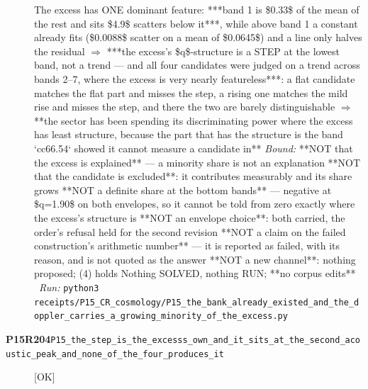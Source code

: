 \begin{description}
The excess has ONE dominant feature: ***band 1 is \$0.33\$ of the mean of the rest and sits \$4.9\$ scatters below it***, while above band 1 a constant already fits (\$0.0088\$ scatter on a mean of \$0.0645\$) and a line only halves the residual \ensuremath{\Rightarrow} ***the excess's \$q\$-structure is a STEP at the lowest band, not a trend --- and all four candidates were judged on a trend across bands 2--7, where the excess is very nearly featureless***: a flat candidate matches the flat part and misses the step, a rising one matches the mild rise and misses the step, and there the two are barely distinguishable \ensuremath{\Rightarrow} **the sector has been spending its discriminating power where the excess has least structure, because the part that has the structure is the band `cc66.54` showed it cannot measure a candidate in**
 \emph{Bound:}  **NOT that the excess is explained** --- a minority share is not an explanation  **NOT that the candidate is excluded**: it contributes measurably and its share grows  **NOT a definite share at the bottom bands** --- negative at \$q=1.90\$ on both envelopes, so it cannot be told from zero exactly where the excess's structure is  **NOT an envelope choice**: both carried, the order's refusal held for the second revision  **NOT a claim on the failed construction's arithmetic number** --- it is reported as failed, with its reason, and is not quoted as the answer  **NOT a new channel**: nothing proposed; (4) holds  Nothing SOLVED, nothing RUN; **no corpus edits**
\ \emph{Run:} \texttt{python3 receipts/P15\_CR\_cosmology/P15\_the\_bank\_already\_existed\_and\_the\_doppler\_carries\_a\_growing\_minority\_of\_the\_excess.py}
\item[\rcptlabel{P15_the_step_is_the_excesss_own_and_it_sits_at_the_second_acoustic_peak_and_none_of_the_four_produces_it}{P15R204}\textbf{P15R204}\quad\texttt{P15\_the\_step\_is\_the\_excesss\_own\_and\_it\_sits\_at\_the\_second\_acoustic\_peak\_and\_none\_of\_the\_four\_produces\_it}]\hfill\textsf{[OK]}\\

\end{description}
